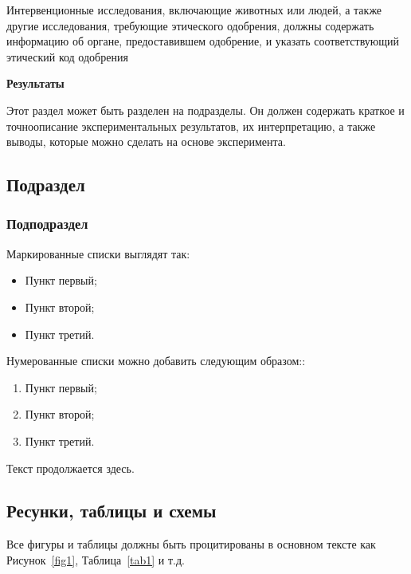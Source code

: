 \documentclass[i-edu.uz,journal,article,submit,pdftex,moreauthors]{Definitions/i-edu.uz}
\begin{document}
\begin{sloppypar}
{Интервенционные исследования, включающие животных или людей, а также другие исследования, требующие этического одобрения, должны содержать информацию об органе, предоставившем одобрение, и указать соответствующий этический код одобрения

\noindent\textbf{Результаты}

Этот раздел может быть разделен на подразделы. Он должен содержать краткое и точноописание экспериментальных результатов, их интерпретацию, а также выводы, которые можно сделать на основе эксперимента.
\subsection{Подраздел}
\subsubsection{Подподраздел}

Маркированные списки выглядят так:
\begin{itemize}
\item	Пункт первый;
\item	Пункт второй;
\item	Пункт третий.
\end{itemize}

Нумерованные списки можно добавить следующим образом::
\begin{enumerate}
\item	Пункт первый;
\item	Пункт второй;
\item	Пункт третий.
\end{enumerate}

Текст продолжается здесь. 

\subsection{Ресунки, таблицы и схемы}

Все фигуры и таблицы должны быть процитированы в основном тексте как Рисунок~\ref{fig1}, Таблица~\ref{tab1} и т.д.

}
\end{sloppypar}
\end{document}
